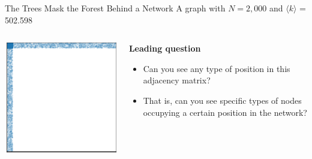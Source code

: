 \documentclass[notes, aspectratio=1610]{beamer}
\begin{document}
\begin{frame}{The Trees Mask the Forest Behind a Network}
	{A graph with $N = 2,000$ and $\langle k \rangle$ = 502.598 }
	\begin{columns}
		\begin{column}{0.5\textwidth}
			\centering 
			\includegraphics[]{images/blockmodel.pdf}

		\end{column}
		\begin{column}{0.3\textwidth}
			\textbf{Leading question}

			\begin{itemize}
				\item 
				Can you see any type of position in this 
				adjacency matrix?
				\item That is, can you see specific types of nodes 
				occupying a certain position in the network?
			\end{itemize}
		\end{column}
	\end{columns}
\end{frame}
\end{document}
